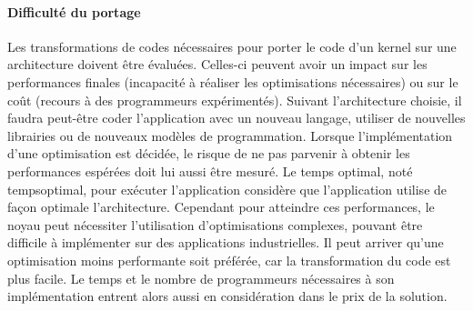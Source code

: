     \paragraph{Difficulté du portage}
        Les transformations de codes nécessaires pour porter le code d'un kernel sur une architecture doivent être évaluées. Celles-ci peuvent avoir un impact sur les performances finales (incapacité à réaliser les optimisations nécessaires) ou sur le coût (recours à des programmeurs expérimentés).  Suivant l'architecture choisie, il faudra peut-être coder l'application avec un nouveau langage, utiliser de nouvelles librairies ou de nouveaux modèles de programmation. Lorsque l'implémentation d'une optimisation est décidée, le risque de ne pas parvenir à obtenir les performances espérées doit lui aussi être mesuré. Le temps optimal, noté \gls{tempsoptimal}, pour exécuter l'application considère que l'application utilise de façon optimale l'architecture. Cependant pour atteindre ces performances, le noyau peut nécessiter l’utilisation d'optimisations complexes, pouvant être difficile à implémenter sur des applications industrielles. Il peut arriver qu'une optimisation moins performante soit préférée, car la transformation du code est plus facile. Le temps et le nombre de programmeurs nécessaires à son implémentation entrent alors aussi en considération dans le prix de la solution.
    
                           